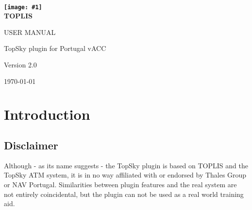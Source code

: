 \documentclass[a4paper,oneside,11pt]{memoir}
\newcommand{\image}[1]{\texttt{[image: \#1]}}
\begin{document}
%
%
\thispagestyle{empty}

{%

\centering
\Large

~\vspace{\fill}

{\huge
  \textbf{ 
    \image{img/logo.png}\\
    TOPLIS
}
}

\vspace{2.5cm}

{\LARGE
USER MANUAL
}

\vspace{3.5cm}

TopSky plugin for Portugal vACC

\medskip

Version 2.0

\medskip

\vspace{\fill}

\today

}%

\cleardoublepage

\tableofcontents*

\clearpage


\chapter{Introduction}

\section{Disclaimer}

Although - as its name suggests - the TopSky plugin is based on TOPLIS and the TopSky ATM system, it is in no way affiliated with or endorsed by Thales Group or NAV Portugal. Similarities between plugin features and the real system are not entirely coincidental, but the plugin can not be used as a real world training aid.
\end{document}
